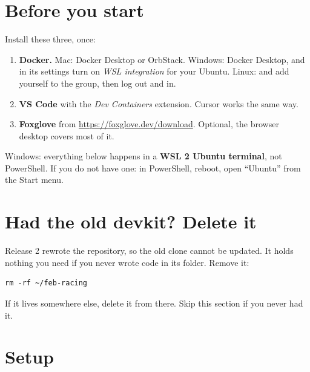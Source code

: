 \documentclass[11pt,a4paper]{article}
\begin{document}

\section{Before you start}

Install these three, once:

\begin{enumerate}
  \item \textbf{Docker.} Mac: Docker Desktop or OrbStack. Windows: Docker Desktop, and in its settings
  turn on \emph{WSL integration} for your Ubuntu. Linux:  and add
  yourself to the  group, then log out and in.
  \item \textbf{VS Code} with the \emph{Dev Containers} extension. Cursor works the same way.
  \item \textbf{Foxglove} from \url{https://foxglove.dev/download}. Optional, the browser desktop covers most of it.
\end{enumerate}

Windows: everything below happens in a \textbf{WSL 2 Ubuntu terminal}, not PowerShell. If you do not
have one:  in PowerShell, reboot, open ``Ubuntu'' from the Start menu.

\section{Had the old devkit? Delete it}

Release 2 rewrote the repository, so the old clone cannot be updated. It holds nothing you need
if you never wrote code in its  folder. Remove it:

\begin{lstlisting}
rm -rf ~/feb-racing
\end{lstlisting}

If it lives somewhere else, delete it from there. Skip this section if you never had it.

\section{Setup}
\end{document}
